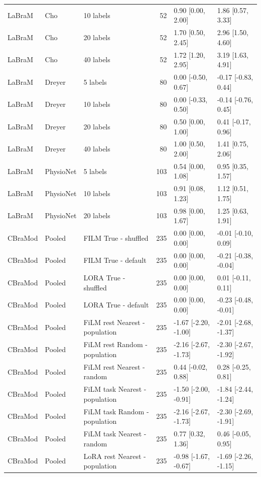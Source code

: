 \begin{longtable}{p{.65in}p{.60in}p{1.9in}rp{1.20in}p{1.20in}}
LaBraM & Cho & 10 labels & 52 & 0.90 [0.00, 2.00] & 1.86 [0.57, 3.33] \\
LaBraM & Cho & 20 labels & 52 & 1.70 [0.50, 2.45] & 2.96 [1.50, 4.60] \\
LaBraM & Cho & 40 labels & 52 & 1.72 [1.20, 2.95] & 3.19 [1.63, 4.91] \\
LaBraM & Dreyer & 5 labels & 80 & 0.00 [-0.50, 0.67] & -0.17 [-0.83, 0.44] \\
LaBraM & Dreyer & 10 labels & 80 & 0.00 [-0.33, 0.50] & -0.14 [-0.76, 0.45] \\
LaBraM & Dreyer & 20 labels & 80 & 0.50 [0.00, 1.00] & 0.41 [-0.17, 0.96] \\
LaBraM & Dreyer & 40 labels & 80 & 1.00 [0.50, 2.00] & 1.41 [0.75, 2.06] \\
LaBraM & PhysioNet & 5 labels & 103 & 0.54 [0.00, 1.08] & 0.95 [0.35, 1.57] \\
LaBraM & PhysioNet & 10 labels & 103 & 0.91 [0.08, 1.23] & 1.12 [0.51, 1.75] \\
LaBraM & PhysioNet & 20 labels & 103 & 0.98 [0.00, 1.67] & 1.25 [0.63, 1.91] \\
CBraMod & Pooled & FILM True - shuffled & 235 & 0.00 [0.00, 0.00] & -0.01 [-0.10, 0.09] \\
CBraMod & Pooled & FILM True - default & 235 & 0.00 [0.00, 0.00] & -0.21 [-0.38, -0.04] \\
CBraMod & Pooled & LORA True - shuffled & 235 & 0.00 [0.00, 0.00] & 0.01 [-0.11, 0.11] \\
CBraMod & Pooled & LORA True - default & 235 & 0.00 [0.00, 0.00] & -0.23 [-0.48, -0.01] \\
CBraMod & Pooled & FiLM rest Nearest - population & 235 & -1.67 [-2.20, -1.00] & -2.01 [-2.68, -1.37] \\
CBraMod & Pooled & FiLM rest Random - population & 235 & -2.16 [-2.67, -1.73] & -2.30 [-2.67, -1.92] \\
CBraMod & Pooled & FiLM rest Nearest - random & 235 & 0.44 [-0.02, 0.88] & 0.28 [-0.25, 0.81] \\
CBraMod & Pooled & FiLM task Nearest - population & 235 & -1.50 [-2.00, -0.91] & -1.84 [-2.44, -1.24] \\
CBraMod & Pooled & FiLM task Random - population & 235 & -2.16 [-2.67, -1.73] & -2.30 [-2.69, -1.91] \\
CBraMod & Pooled & FiLM task Nearest - random & 235 & 0.77 [0.32, 1.36] & 0.46 [-0.05, 0.95] \\
CBraMod & Pooled & LoRA rest Nearest - population & 235 & -0.98 [-1.67, -0.67] & -1.69 [-2.26, -1.15] \\

\end{longtable}
